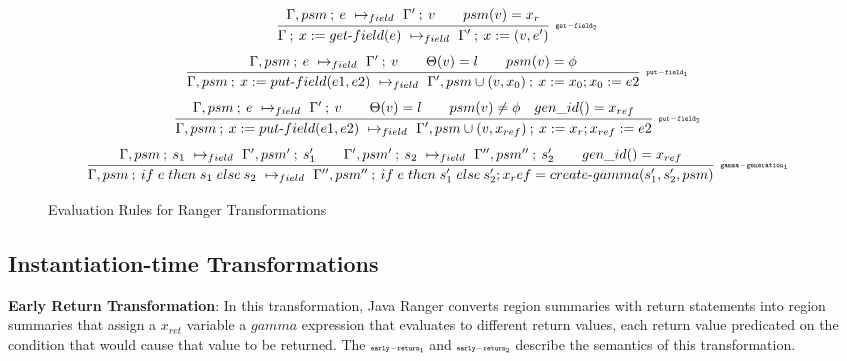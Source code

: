 \begin{figure*}[t]
{{$$$$
$$
\infer[\rn{get-field_2}]
 {\step{\Gamma}{x := get\text{-}field(e)}{\Gamma'}{ x := (v,e')}{field}}
 {\step{\Gamma, psm}{e}{\Gamma'}{v}{field} \qquad psm(v) = x_r}
$$
$$
\infer[\rn{put-field_1}]
 {\step{\Gamma, psm}{x := put\text{-}field(e1, e2)}{\Gamma', psm\cup(v, x_0)}{ x := x_0; x_0 := e2}{field}}
 {\step{\Gamma, psm}{e}{\Gamma'}{v}{field} \qquad \Theta(v) = l \qquad psm(v) = \phi }
$$
$$
\infer[\rn{put-field_2}]
 {\step{\Gamma, psm}{x := put\text{-}field(e1, e2)}{\Gamma', psm\cup(v, x_{ref})}{ x := x_r; x_{ref} := e2}{field}}
 {\step{\Gamma, psm}{e}{\Gamma'}{v}{field} \qquad \Theta(v) = l \qquad psm(v) \neq \phi \quad gen\_id() = x_{ref}}
$$
$$
\infer[\rn{gamma-generation_1}]
 {\step{\Gamma, psm}{\ifr{e}{s_1}{s_2}}{\Gamma'', psm''}{\ifr{e}{s_1'}{s_2'} ; x_ref = create\text{-}gamma(s_1', s_2', psm)}{field}}
 {\step{\Gamma, psm}{s_1}{\Gamma', psm'}{s_1'}{field} \qquad 
 \step{\Gamma', psm'}{s_2}{\Gamma'', psm''}{s_2'}{field}  \qquad gen\_id() = x_{ref}}
$$
}}
\caption{Evaluation Rules for Ranger Transformations}
\label{fig:semantics}
\end{figure*}

\subsection{Instantiation-time Transformations}
\label{sec:instantiationTransformations}

\textbf{Early Return Transformation}: In this transformation, Java Ranger converts region summaries with return
statements into region summaries that assign a $x_{ret}$ variable a $gamma$ expression that evaluates to different
return values, each return value predicated on the condition that would cause that value to be returned.
%
The $\scriptscriptstyle\mathtt{early-return_1}$ and $\scriptscriptstyle\mathtt{early-return_2}$ describe the semantics of this transformation.
%
%

